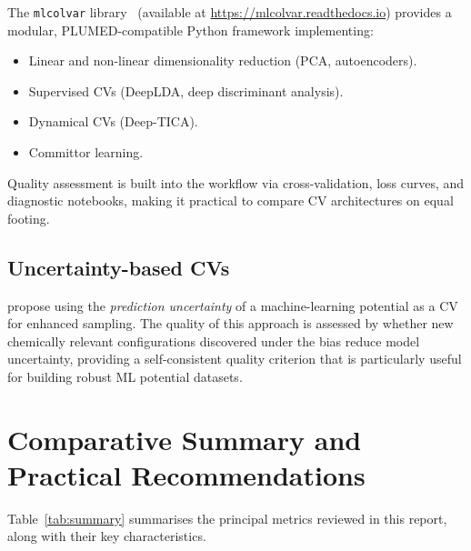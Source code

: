 \documentclass[12pt, a4paper]{article}
\begin{document}
The \texttt{mlcolvar} library~\citep{Bonati2023mlcolvar} 
(available at \url{https://mlcolvar.readthedocs.io}) provides a 
modular, PLUMED-compatible Python framework implementing:
\begin{itemize}[noitemsep]
  \item Linear and non-linear dimensionality reduction 
        (PCA, autoencoders).
  \item Supervised CVs (DeepLDA, deep discriminant analysis).
  \item Dynamical CVs (Deep-TICA).
  \item Committor learning.
\end{itemize}
Quality assessment is built into the workflow via 
cross-validation, loss curves, and diagnostic notebooks, making it 
practical to compare CV architectures on equal footing.

\subsection{Uncertainty-based CVs}

\citet{Zaverkin2025UncertCV} propose using the \emph{prediction 
uncertainty} of a machine-learning potential as a CV for enhanced 
sampling.  The quality of this approach is assessed by whether new 
chemically relevant configurations discovered under the bias reduce 
model uncertainty, providing a self-consistent quality criterion 
that is particularly useful for building robust ML potential datasets.

\section{Comparative Summary and Practical Recommendations}
\label{sec:summary}

Table~\ref{tab:summary} summarises the principal metrics reviewed 
in this report, along with their key characteristics.
\end{document}
